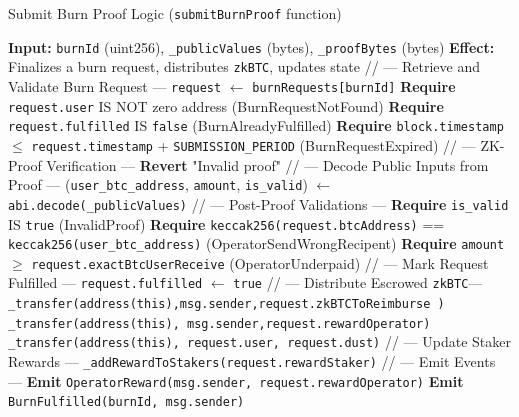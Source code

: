 \documentclass{DESSThesis}
\newcommand{\zktoken}{\texttt{zkBTC}}
\begin{document}
\begin{algorithm}
\caption{Submit Burn Proof Logic (\texttt{submitBurnProof} function)}
\label{alg:submit_burn_proof}
\begin{algorithmic}[1]
        \State \textbf{Input:} \texttt{burnId} (uint256), \texttt{\_publicValues} (bytes), \texttt{\_proofBytes} (bytes)
        \State \textbf{Effect:} Finalizes a burn request, distributes \texttt{\zktoken}, updates state
        \State
        \State // --- Retrieve and Validate Burn Request ---
        \State \texttt{request} $\gets$ \texttt{burnRequests[burnId]}
        \State \textbf{Require} \texttt{request.user} IS NOT zero address (BurnRequestNotFound)
        \State \textbf{Require} \texttt{request.fulfilled} IS \texttt{false} (BurnAlreadyFulfilled)
        \State \textbf{Require} \texttt{block.timestamp} $\le$ \texttt{request.timestamp} + \texttt{SUBMISSION\_PERIOD} (BurnRequestExpired)
        \State
        \State // --- ZK-Proof Verification ---
            \State \textbf{Revert} "Invalid proof"
        \EndIf
        \State
        \State // --- Decode Public Inputs from Proof ---
        \State (\texttt{user\_btc\_address}, \texttt{amount}, \texttt{is\_valid}) $\gets$ \texttt{abi.decode(\_publicValues)}
        \State
        \State // --- Post-Proof Validations ---
        \State \textbf{Require} \texttt{is\_valid} IS \texttt{true} (InvalidProof)
        \State \textbf{Require} \texttt{keccak256(request.btcAddress)} == \texttt{keccak256(user\_btc\_address)} (OperatorSendWrongRecipent)
        \State \textbf{Require} \texttt{amount} $\ge$ \texttt{request.exactBtcUserReceive} (OperatorUnderpaid)
        \State
        \State // --- Mark Request Fulfilled ---
        \State \texttt{request.fulfilled} $\gets$ \texttt{true}
        \State
        \State // --- Distribute Escrowed \zktoken ---
        \State \texttt{\_transfer(address(this),\allowbreak msg.sender,\allowbreak request.\zktoken ToReimburse \allowbreak)}
        \State \texttt{\_transfer(address(this), msg.sender,\allowbreak request.rewardOperator)}
        \State \texttt{\_transfer(address(this), request.user, request.dust)}
        \State
        \State // --- Update Staker Rewards ---
        \State \texttt{\_addRewardToStakers(request.rewardStaker)}
        \State
        \State // --- Emit Events ---
        \State \textbf{Emit} \texttt{OperatorReward(msg.sender, request.rewardOperator)}
        \State \textbf{Emit} \texttt{BurnFulfilled(burnId, msg.sender)}
    \EndProcedure
\end{algorithmic}
\end{algorithm}
\end{document}
